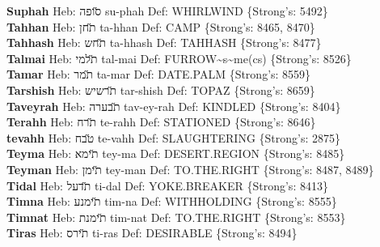 {\textbf{Suphah} Heb: {\large\H סופה} su-phah Def: WHIRLWIND \{Strong's: 5492\}\hfill{}\\

\textbf{Tahhan} Heb: {\large\H תחן} ta-hhan Def: CAMP \{Strong's: 8465, 8470\}\hfill{}\\

\textbf{Tahhash} Heb: {\large\H תחש} ta-hhash Def: TAHHASH \{Strong's: 8477\}\hfill{}\\

\textbf{Talmai} Heb: {\large\H תלמי} tal-mai Def: FURROW\textasciitilde{}s\textasciitilde{}me(cs) \{Strong's: 8526\}\hfill{}\\

\textbf{Tamar} Heb: {\large\H תמר} ta-mar Def: DATE.PALM \{Strong's: 8559\}\hfill{}\\

\textbf{Tarshish} Heb: {\large\H תרשיש} tar-shish Def: TOPAZ \{Strong's: 8659\}\hfill{}\\

\textbf{Taveyrah} Heb: {\large\H תבערה} tav-ey-rah Def: KINDLED \{Strong's: 8404\}\hfill{}\\

\textbf{Terahh} Heb: {\large\H תרח} te-rahh Def: STATIONED \{Strong's: 8646\}\hfill{}\\

\textbf{tevahh} Heb: {\large\H טבח} te-vahh Def: SLAUGHTERING \{Strong's: 2875\}\hfill{}\\

\textbf{Teyma} Heb: {\large\H תימא} tey-ma Def: DESERT.REGION \{Strong's: 8485\}\hfill{}\\

\textbf{Teyman} Heb: {\large\H תימן} tey-man Def: TO.THE.RIGHT \{Strong's: 8487, 8489\}\hfill{}\\

\textbf{Tidal} Heb: {\large\H תדעל} ti-dal Def: YOKE.BREAKER \{Strong's: 8413\}\hfill{}\\

\textbf{Timna} Heb: {\large\H תימנע} tim-na Def: WITHHOLDING \{Strong's: 8555\}\hfill{}\\

\textbf{Timnat} Heb: {\large\H תימנת} tim-nat Def: TO.THE.RIGHT \{Strong's: 8553\}\hfill{}\\

\textbf{Tiras} Heb: {\large\H תירס} ti-ras Def: DESIRABLE \{Strong's: 8494\}\hfill{}\\

}
